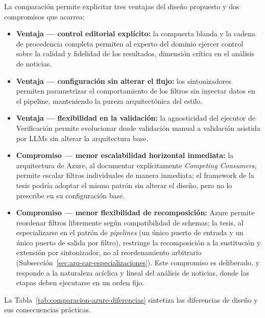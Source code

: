 La comparación permite explicitar tres ventajas del diseño propuesto y
dos compromisos que acarrea:

\begin{itemize}
  \item \textbf{Ventaja --- control editorial explícito:} la compuerta
        blanda y la cadena de procedencia completa permiten al experto del
        dominio ejercer control sobre la calidad y fidelidad de los
        resultados, dimensión crítica en el análisis de noticias.
  \item \textbf{Ventaja --- configuración sin alterar el flujo:} los
        sintonizadores permiten parametrizar el comportamiento de los
        filtros sin inyectar datos en el pipeline, manteniendo la pureza
        arquitectónica del estilo.
  \item \textbf{Ventaja --- flexibilidad en la validación:} la
        agnosticidad del ejecutor de Verificación permite evolucionar
        desde validación manual a validación asistida por LLMs sin alterar
        la arquitectura base.
  \item \textbf{Compromiso --- menor escalabilidad horizontal inmediata:}
        la arquitectura de Azure, al documentar explícitamente
        \textit{Competing Consumers}, permite escalar filtros individuales
        de manera inmediata; el framework de la tesis podría adoptar el
        mismo patrón sin alterar el diseño, pero no lo prescribe en su
        configuración base.
  \item \textbf{Compromiso --- menor flexibilidad de recomposición:}
        Azure permite reordenar filtros libremente según compatibilidad
        de schemas; la tesis, al especializarse en el patrón de
        \textit{pipelines} (un único puerto de entrada y un único puerto
        de salida por filtro), restringe la recomposición a la sustitución
        y extensión por sintonizador, no al reordenamiento arbitrario
        (Subsección~\ref{sec:arq-car-especializaciones}). Este compromiso
        es deliberado, y responde a la naturaleza acíclica y lineal del
        análisis de noticias, donde las etapas deben ejecutarse en un
        orden fijo.
\end{itemize}

La Tabla~\ref{tab:comparacion-azure-diferencias} sintetiza las diferencias
de diseño y sus consecuencias prácticas.


